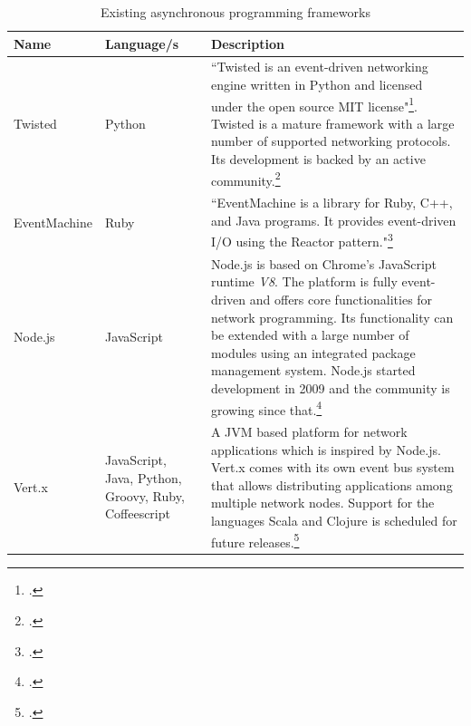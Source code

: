 \begin{savenotes} %
\begin{table}[htbp]
\begin{tabular*}{\textwidth}{p{} p{} p{}}
\toprule
\textbf{Name} & \textbf{Language/s} & \textbf{Description} \\
\midrule 
Twisted			& Python			& ``Twisted is an event-driven networking engine written in 
									  Python and licensed under the open source MIT license"\footcite[Cf.][]{Twisted_2012}.
									  Twisted is a mature framework with a large number of supported networking
									  protocols. Its development is backed by an active
									  community.\footcite[Cf.][12]{fettig_2005}
									  \\
									  
EventMachine 	& Ruby    			& ``EventMachine is a library for Ruby, C++, and Java
									  programs. It provides event-driven I/O using the Reactor 
									  pattern."\footcite[]{eventmachine_2012}\\

Node.js			& JavaScript		& Node.js is based on Chrome's JavaScript runtime \textit{V8}.
									  The platform is fully event-driven and offers core
									  functionalities for network programming. Its functionality
									  can be extended with a large number of modules using an
									  integrated package management system.
									  Node.js started development in 2009 and the community
									  is growing since that.\footcite[Cf.][]{Mashtable_2011}\\
									  
Vert.x			& JavaScript, Java, Python, Groovy, Ruby, Coffeescript		
									& A JVM based platform for network applications which is
									  inspired by Node.js. Vert.x comes with its own event
									  bus system that allows distributing applications
									  among multiple network nodes. Support for the languages
									  Scala and Clojure is scheduled for future releases.\footcite[Cf.][]{vertx_2012}\\
\bottomrule 
\end{tabular*}
  \caption{Existing asynchronous programming frameworks}
  \label{tab:existing_frameworks}
\end{table}
\end{savenotes}

